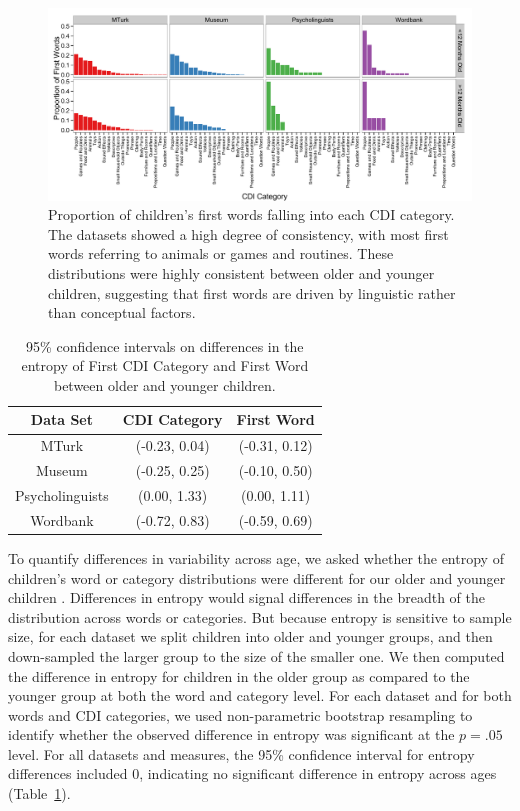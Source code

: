 \documentclass[10pt,letterpaper]{article}
\begin{document}
\begin{figure}[tb]
\begin{center}
\includegraphics[width = .9\textwidth]{figures/cdicats_4sets.pdf}
\end{center}
\caption{Proportion of children's first words falling into each CDI category. The datasets showed a high degree of consistency, with most first words referring to animals or games and routines. These distributions were highly consistent between older and younger children, suggesting that first words are driven by linguistic rather than conceptual factors.}
\label{fig:cdi_cats}
\vspace{-1em}
\end{figure}


\begin{table}[tb]
\centering
\begin{tabular}{ccc}
\hline
Data Set & CDI Category & First Word \\ 
  \hline
  MTurk & (-0.23, 0.04) & (-0.31, 0.12) \\ 
  Museum & (-0.25, 0.25) & (-0.10, 0.50) \\ 
  Psycholinguists & (0.00, 1.33) & (0.00, 1.11) \\ 
  Wordbank & (-0.72, 0.83) & (-0.59, 0.69) \\ 
   \hline
\end{tabular}
\label{tab:ent_diffs}
\caption{95\% confidence intervals on differences in the entropy of First CDI Category and First Word between older and younger children.}
\end{table}

To quantify differences in variability across age, we asked whether the entropy of children's word or category distributions were different for our older and younger children \cite{shannon1948}. Differences in entropy would signal differences in the breadth of the distribution across words or categories. But because entropy is sensitive to sample size, for each dataset we split children into older and younger groups, and then down-sampled the larger group to the size of the smaller one. We then computed the difference in entropy for children in the older group as compared to the younger group at both the word and category level. For each dataset and for both words and CDI categories, we used non-parametric bootstrap resampling to identify whether the observed difference in entropy was significant at the $p = .05$ level. For all datasets and measures, the 95\% confidence interval for entropy differences included 0, indicating no significant difference in entropy across ages (Table~\ref{tab:ent_diffs}).
\end{document}
